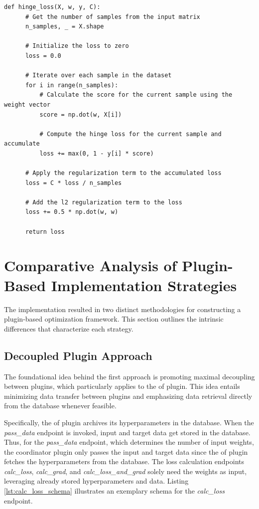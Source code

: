\documentclass[
  a4paper,  %
  twoside,  %
  bibliography=totoc,
  headsepline,
  cleardoublepage=empty,
  parskip=half,
  draft=false
]{scrbook}
\begin{document}
\begin{lstlisting}[caption={Hinge Loss Calculation}, label=alg:hinge_loss]
  def hinge_loss(X, w, y, C):
      # Get the number of samples from the input matrix
      n_samples, _ = X.shape

      # Initialize the loss to zero
      loss = 0.0

      # Iterate over each sample in the dataset
      for i in range(n_samples):
          # Calculate the score for the current sample using the weight vector
          score = np.dot(w, X[i])

          # Compute the hinge loss for the current sample and accumulate
          loss += max(0, 1 - y[i] * score)

      # Apply the regularization term to the accumulated loss
      loss = C * loss / n_samples

      # Add the l2 regularization term to the loss
      loss += 0.5 * np.dot(w, w)

      return loss
\end{lstlisting}

\section{Comparative Analysis of Plugin-Based Implementation Strategies}
\label{sec:differencesBetweenTheTwoPluginBasedImplementationApproaches}

The implementation resulted in two distinct methodologies for constructing a plugin-based optimization framework.
This section outlines the intrinsic differences that characterize each strategy.

\subsection{Decoupled Plugin Approach}
\label{sec:firstApproach}

The foundational idea behind the first approach is promoting maximal decoupling between plugins, which particularly applies to the \gls{of} plugin.
This idea entails minimizing data transfer between plugins and emphasizing data retrieval directly from the database whenever feasible.

Specifically, the \gls{of} plugin archives its hyperparameters in the database.
When the \emph{pass\_data} endpoint is invoked, input and target data get stored in the database.
Thus, for the \emph{pass\_data} endpoint, which determines the number of input weights, the coordinator plugin only passes the input and target data since the \gls{of} plugin fetches the hyperparameters from the database.
The loss calculation endpoints \emph{calc\_loss}, \emph{calc\_grad}, and \emph{calc\_loss\_and\_grad} solely need the weights as input, leveraging already stored hyperparameters and data.
Listing \ref{lst:calc_loss_schema} illustrates an exemplary schema for the \emph{calc\_loss} endpoint.
\end{document}

